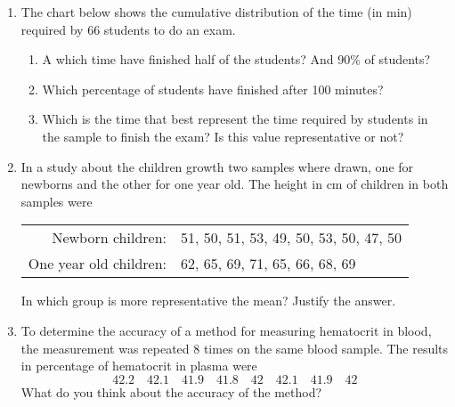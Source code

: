 \begin{enumerate}[leftmargin=*]
\item The chart below shows the cumulative distribution of the time (in min)
required by 66 students to do an exam.

\begin{center}
\resizebox{0.7\textwidth}{!}{}
\end{center}

\begin{enumerate}
\item A which time have finished half of the students? And 90\% of students?
\item Which percentage of students have finished after 100 minutes?
\item Which is the time that best represent the time required by students in the sample to finish the exam? Is this
value representative or not?
\end{enumerate}




\item In a study about the children growth two samples where drawn, one for
newborns and the other for one year old.
The height in cm of children in both samples were
\begin{center}
\begin{tabular}{rl}
Newborn children: & 51, 50, 51, 53, 49, 50, 53, 50, 47, 50\\
One year old children: & 62, 65, 69, 71, 65, 66, 68, 69
\end{tabular}
\end{center}

In which group is more representative the mean? Justify the answer.

\item To determine the accuracy of a method for measuring hematocrit in blood, the measurement was repeated 8 times on
the same blood sample.
The results in percentage of hematocrit in plasma were
\[
42.2\quad 42.1\quad 41.9\quad 41.8\quad 42\quad 42.1\quad 41.9\quad 42
\]
What do you think about the accuracy of the method?



\end{enumerate}
